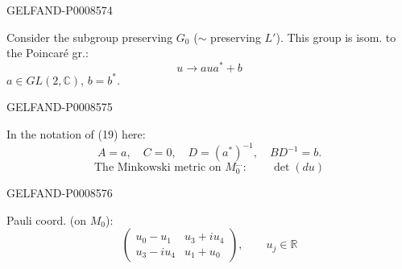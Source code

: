 \begin{GelfandAdjacentEvidence}{GELFAND-P000857}{4}


Consider the subgroup preserving \(G_0\) (\(\sim\) preserving \(L'\)). This group is isom. to the Poincaré gr.:
\[
u\to aua^*+b\tag{21}
\]
\(a\in GL(2,\mathbb C)\), \(b=b^*\).
\end{GelfandAdjacentEvidence}
\begin{GelfandAdjacentEvidence}{GELFAND-P000857}{5}


In the notation of (19) here:
\[
A=a,\quad C=0,\quad D=(a^*)^{-1},\quad BD^{-1}=b.\tag{22}
\]
\[
\text{The Minkowski metric on }M_0^{\text{…}}:\qquad \det(du)\tag{23}
\]
\end{GelfandAdjacentEvidence}
\begin{GelfandAdjacentEvidence}{GELFAND-P000857}{6}

Pauli coord. (on \(M_0\)):
\[
\begin{pmatrix}
u_0-u_1&u_3+i u_4\\
u_3-i u_4&u_1+u_0
\end{pmatrix},\qquad u_j\in\mathbb R\tag{24}
\]
\end{GelfandAdjacentEvidence}



